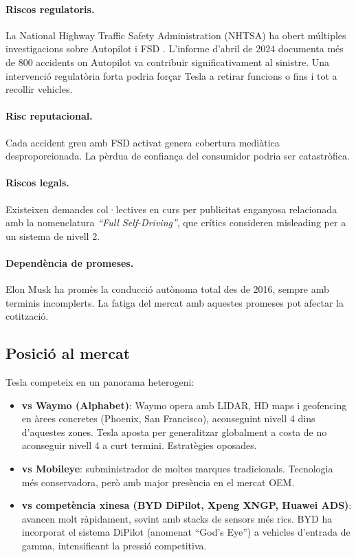 \documentclass[11pt,a4paper]{article}
\begin{document}
\paragraph{Riscos regulatoris.} La National Highway Traffic Safety Administration (NHTSA) ha obert múltiples investigacions sobre Autopilot i FSD \cite{nhtsa2024}. L'informe d'abril de 2024 documenta més de 800 accidents on Autopilot va contribuir significativament al sinistre. Una intervenció regulatòria forta podria forçar Tesla a retirar funcions o fins i tot a recollir vehicles.

\paragraph{Risc reputacional.} Cada accident greu amb FSD activat genera cobertura mediàtica desproporcionada. La pèrdua de confiança del consumidor podria ser catastròfica.

\paragraph{Riscos legals.} Existeixen demandes col·lectives en curs per publicitat enganyosa relacionada amb la nomenclatura \emph{``Full Self-Driving''}, que crítics consideren misleading per a un sistema de nivell 2.

\paragraph{Dependència de promeses.} Elon Musk ha promès la conducció autònoma total des de 2016, sempre amb terminis incomplerts. La fatiga del mercat amb aquestes promeses pot afectar la cotització.

\subsection{Posició al mercat}

Tesla competeix en un panorama heterogeni:

\begin{itemize}[leftmargin=*]
    \item \textbf{vs Waymo (Alphabet)}: Waymo opera amb LIDAR, HD maps i geofencing en àrees concretes (Phoenix, San Francisco), aconseguint nivell 4 dins d'aquestes zones. Tesla aposta per generalitzar globalment a costa de no aconseguir nivell 4 a curt termini. Estratègies oposades.
    \item \textbf{vs Mobileye}: subministrador de moltes marques tradicionals. Tecnologia més conservadora, però amb major presència en el mercat OEM.
    \item \textbf{vs competència xinesa (BYD DiPilot, Xpeng XNGP, Huawei ADS)}: avancen molt ràpidament, sovint amb stacks de sensors més rics. BYD ha incorporat el sistema DiPilot (anomenat ``God's Eye'') a vehicles d'entrada de gamma, intensificant la pressió competitiva.
\end{itemize}
\end{document}
